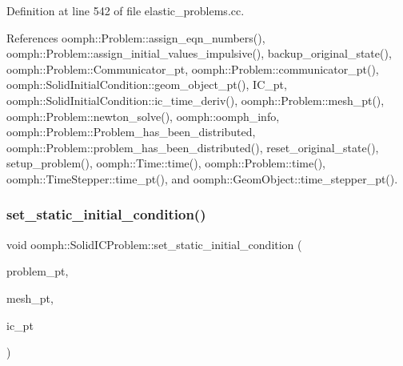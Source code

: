 Definition at line 542 of file elastic\+\_\+problems.\+cc.



References oomph\+::\+Problem\+::assign\+\_\+eqn\+\_\+numbers(), oomph\+::\+Problem\+::assign\+\_\+initial\+\_\+values\+\_\+impulsive(), backup\+\_\+original\+\_\+state(), oomph\+::\+Problem\+::\+Communicator\+\_\+pt, oomph\+::\+Problem\+::communicator\+\_\+pt(), oomph\+::\+Solid\+Initial\+Condition\+::geom\+\_\+object\+\_\+pt(), I\+C\+\_\+pt, oomph\+::\+Solid\+Initial\+Condition\+::ic\+\_\+time\+\_\+deriv(), oomph\+::\+Problem\+::mesh\+\_\+pt(), oomph\+::\+Problem\+::newton\+\_\+solve(), oomph\+::oomph\+\_\+info, oomph\+::\+Problem\+::\+Problem\+\_\+has\+\_\+been\+\_\+distributed, oomph\+::\+Problem\+::problem\+\_\+has\+\_\+been\+\_\+distributed(), reset\+\_\+original\+\_\+state(), setup\+\_\+problem(), oomph\+::\+Time\+::time(), oomph\+::\+Problem\+::time(), oomph\+::\+Time\+Stepper\+::time\+\_\+pt(), and oomph\+::\+Geom\+Object\+::time\+\_\+stepper\+\_\+pt().

\mbox{\label{classoomph_1_1SolidICProblem_ae5ba8df393fa9d08ac12200ef4c7e293}} 
\subsubsection{\texorpdfstring{set\+\_\+static\+\_\+initial\+\_\+condition()}{set\_static\_initial\_condition()}\hspace{0.1cm}{\footnotesize\ttfamily [2/2]}}
{\footnotesize\ttfamily void oomph\+::\+Solid\+I\+C\+Problem\+::set\+\_\+static\+\_\+initial\+\_\+condition (\begin{DoxyParamCaption}\item[{\hyperlink{classoomph_1_1Problem}{Problem} $\ast$}]{problem\+\_\+pt,  }\item[{\hyperlink{classoomph_1_1Mesh}{Mesh} $\ast$}]{mesh\+\_\+pt,  }\item[{\hyperlink{classoomph_1_1SolidInitialCondition}{Solid\+Initial\+Condition} $\ast$}]{ic\+\_\+pt }\end{DoxyParamCaption})\hspace{0.3cm}{\ttfamily [inline]}}



